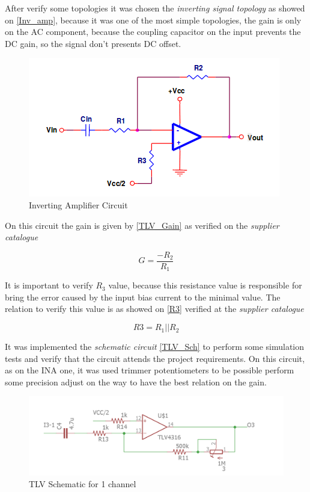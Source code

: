 After verify some topologies it was chosen the \textit{inverting signal topology} \cite{OpAmps} as showed on \autoref{Inv_amp}, because it was one of the most simple topologies, the
gain is only on the AC component, because the coupling capacitor on the input prevents the DC gain, so the signal don't presents
DC offset.

\begin{figure}[!htpb]
\centering
\caption{Inverting Amplifier Circuit}
\label{Inv_amp}
\includegraphics[scale=1]{images/TLV_Gain}
\end{figure}

On this circuit the gain is given by \autoref{TLV_Gain} as verified on the \textit{supplier catalogue} \cite{OpAmps}

\begin{equation}
\label{TLV_Gain}
G=\frac{-R_2}{R_1}
\end{equation}

It is important to verify $R_3$ value, because this resistance value is responsible for bring the error caused by the
input bias current to the minimal value. The relation to verify this value is as showed on \autoref{R3} verified at
the \textit{supplier catalogue} \cite{OpAmps}

\begin{equation}
\label{R3}
R3=R_1||R_2
\end{equation}

It was implemented the \textit{schematic circuit} \autoref{TLV_Sch} to perform some simulation tests and verify that the circuit attends the project
requirements. On this circuit, as on the INA one, it was used trimmer potentiometers to be possible perform some precision adjust on the way to have
the best relation on the gain.

\begin{figure}[!htpb]
\centering
\caption{TLV Schematic for 1 channel}
\label{TLC_Sch}
\includegraphics[scale=0.4]{images/TLV_1ch}
\end{figure}

